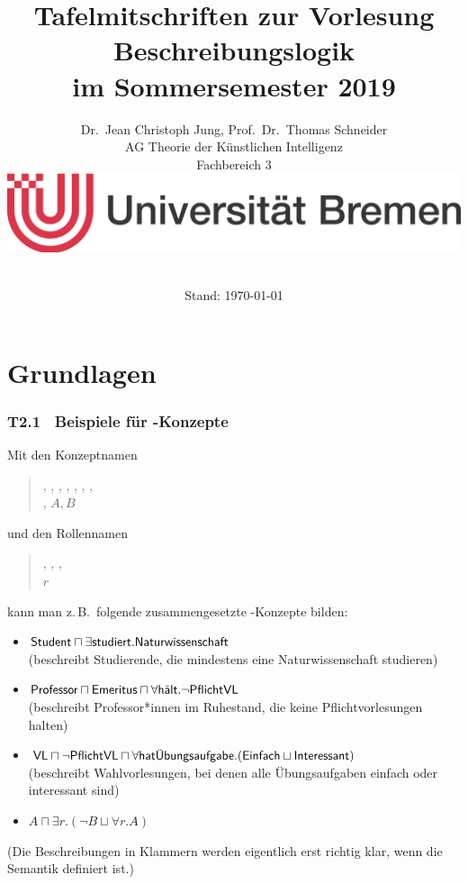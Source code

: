 \documentclass[fontsize=11pt, twoside=false, numbers=autoenddot]{scrbook}
\title{Tafelmitschriften zur Vorlesung \glqq Beschreibungslogik\grqq\\ im Sommersemester 2019}
\author{%
  Dr.\ Jean Christoph Jung, Prof.\ Dr.\ Thomas Schneider\\[1pt]
  AG Theorie der Künstlichen Intelligenz \\[1pt]
  Fachbereich 3 \\
  \includegraphics[width=.4\linewidth]{logo_ub.jpg} \\[\baselineskip]~%
}
\date{Stand: \today}
\begin{document}
\maketitle
\tableofcontents

\part{Grundlagen}

\section*{T2.1~ Beispiele für {\boldmath \ALC}-Konzepte}

Mit den Konzeptnamen
%
\parI
\begin{quote}
  , , , ,
  , , , \\ \mbox{},
  $A,B$
\end{quote}
%
\parI
und den Rollennamen
%
\parI
\begin{quote}
  , , ,\\
  $r$
\end{quote} 
%
\parI
kann man z.\,B.\ folgende zusammengesetzte \ALC-Konzepte bilden:
%
\parI
\begin{itemize}
  \item
    $\textsf{Student} \sqcap \exists\textsf{studiert}.\textsf{Naturwissenschaft}$ \\
    (beschreibt Studierende, die mindestens eine Naturwissenschaft studieren)
    \parI
  \item
    $\textsf{Professor} \sqcap \textsf{Emeritus} \sqcap \forall\textsf{hält}.\lnot\textsf{PflichtVL}$ \\
    (beschreibt Professor*innen im Ruhestand, die keine Pflichtvorlesungen halten)
    \parI
  \item 
    $\textsf{VL} \sqcap \lnot\textsf{PflichtVL} \sqcap \forall\textsf{hatÜbungsaufgabe}.(\textsf{Einfach} \sqcup \textsf{Interessant})$ \\
    (beschreibt Wahlvorlesungen, bei denen alle Übungsaufgaben einfach oder interessant sind)
    \parI
  \item
    $A \sqcap \exists r.(\lnot B \sqcup \forall r.A)$
\end{itemize}
%
\parI
(Die Beschreibungen in Klammern werden eigentlich erst richtig klar, wenn die Semantik definiert ist.)
\end{document}
